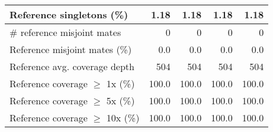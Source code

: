 \documentclass[12pt,a4paper]{article}
\begin{document}
\begin{table}[ht]
\begin{center}
\begin{tabular}{|l*{4}{|r}|}
Reference singletons (\%) & 1.18 & 1.18 & 1.18 & 1.18 \\ \hline
\# reference misjoint mates & 0 & 0 & 0 & 0 \\ \hline
Reference misjoint mates (\%) & 0.0 & 0.0 & 0.0 & 0.0 \\ \hline
Reference avg. coverage depth & 504 & 504 & 504 & 504 \\ \hline
Reference coverage $\geq$ 1x (\%) & 100.0 & 100.0 & 100.0 & 100.0 \\ \hline
Reference coverage $\geq$ 5x (\%) & 100.0 & 100.0 & 100.0 & 100.0 \\ \hline
Reference coverage $\geq$ 10x (\%) & 100.0 & 100.0 & 100.0 & 100.0 \\ \hline
\end{tabular}
\end{center}
\end{table}
\end{document}

